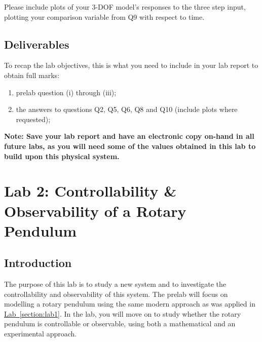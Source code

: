 \documentclass[12pt]{report}
\begin{document}
Please include plots of your 3-DOF model's responses to the three step input, plotting your comparison variable from Q9 with respect to time.

\subsection{Deliverables}
To recap the lab objectives, this is what you need to include in your lab report to obtain full marks:
\begin{enumerate}
    \item prelab question (i) through (iii);
    \item the answers to questions Q2, Q5, Q6, Q8 and Q10 (include plots where requested);
\end{enumerate}
\textbf{Note: Save your lab report and have an electronic copy on-hand in all future labs, as you will need some of the values obtained in this lab to build upon this physical system.}

\newpage
\section{Lab 2: Controllability \& Observability of a Rotary Pendulum} \label{section:lab2}

\subsection{Introduction}\label{subsection:lab2_intro}
The purpose of this lab is to study a new system and to investigate the controllability and observability of this system. The prelab will focus on modelling a rotary pendulum using the same modern approach as was applied in \hyperref[section:lab1]{Lab~\ref{section:lab1}}. In the lab, you will move on to study whether the rotary pendulum is controllable or observable, using both a mathematical and an experimental approach.
\end{document}
